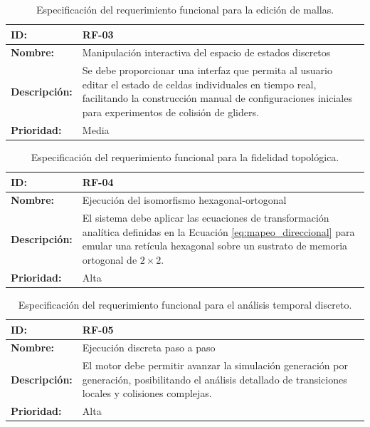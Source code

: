 \begin{table}[ht]
\centering
\begin{tabular}{|l|p{10cm}|}
\hline
\textbf{ID:} & \textbf{RF-03} \\ \hline
\textbf{Nombre:} & Manipulación interactiva del espacio de estados discretos \\ \hline
\textbf{Descripción:} & Se debe proporcionar una interfaz que permita al usuario editar el estado de celdas individuales en tiempo real, facilitando la construcción manual de configuraciones iniciales para experimentos de colisión de gliders. \\ \hline
\textbf{Prioridad:} & Media \\ \hline
\end{tabular}
\caption{Especificación del requerimiento funcional para la edición de mallas.}
\label{tab:rf03}
\end{table}

\begin{table}[ht]
\centering
\begin{tabular}{|l|p{10cm}|}
\hline
\textbf{ID:} & \textbf{RF-04} \\ \hline
\textbf{Nombre:} & Ejecución del isomorfismo hexagonal-ortogonal \\ \hline
\textbf{Descripción:} & El sistema debe aplicar las ecuaciones de transformación analítica definidas en la Ecuación \eqref{eq:mapeo_direccional} para emular una retícula hexagonal sobre un sustrato de memoria ortogonal de $2 \times 2$. \\ \hline
\textbf{Prioridad:} & Alta \\ \hline
\end{tabular}
\caption{Especificación del requerimiento funcional para la fidelidad topológica.}
\label{tab:rf04}
\end{table}

\begin{table}[H]
\centering
\begin{tabular}{|l|p{10cm}|}
\hline
\textbf{ID:} & \textbf{RF-05} \\ \hline
\textbf{Nombre:} & Ejecución discreta paso a paso \\ \hline
\textbf{Descripción:} & El motor debe permitir avanzar la simulación generación por generación, posibilitando el análisis detallado de transiciones locales y colisiones complejas. \\ \hline
\textbf{Prioridad:} & Alta \\ \hline
\end{tabular}
\caption{Especificación del requerimiento funcional para el análisis temporal discreto.}
\label{tab:rf05}
\end{table}


